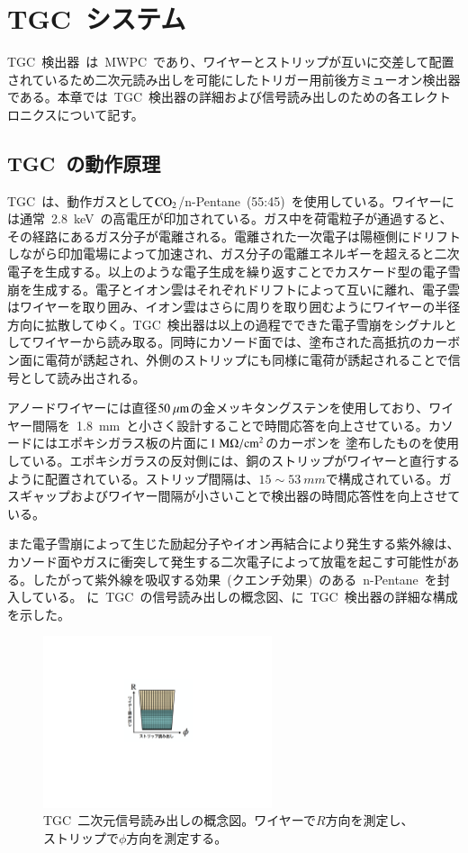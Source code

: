 \chapter{TGC~システム}
\thispagestyle{empty}
\label{chap:4}
TGC~検出器~\cite{TR:04}は~MWPC~であり、ワイヤーとストリップが互いに交差して配置されているため二次元読み出しを可能にしたトリガー用前後方ミューオン検出器である。本章では~TGC~検出器の詳細および信号読み出しのための各エレクトロニクスについて記す。
\section{TGC~の動作原理}
TGC~は、動作ガスとして$\rm{CO_2}$/n-Pentane~(55:45)~を使用している。ワイヤーには通常~2.8~keV~の高電圧が印加されている。ガス中を荷電粒子が通過すると、その経路にあるガス分子が電離される。電離された一次電子は陽極側にドリフトしながら印加電場によって加速され、ガス分子の電離エネルギーを超えると二次電子を生成する。以上のような電子生成を繰り返すことでカスケード型の電子雪崩を生成する。電子とイオン雲はそれぞれドリフトによって互いに離れ、電子雲はワイヤーを取り囲み、イオン雲はさらに周りを取り囲むようにワイヤーの半径方向に拡散してゆく。TGC~検出器は以上の過程でできた電子雪崩をシグナルとしてワイヤーから読み取る。同時にカソード面では、塗布された高抵抗のカーボン面に電荷が誘起され、外側のストリップにも同様に電荷が誘起されることで信号として読み出される。

アノードワイヤーには直径$50~\mu\rm{m}$の金メッキタングステンを使用しており、ワイヤー間隔を~1.8~mm~と小さく設計することで時間応答を向上させている。カソードにはエポキシガラス板の片面に$\rm{1}~\rm{M}\Omega/\rm{cm}^2$のカーボンを
塗布したものを使用している。エポキシガラスの反対側には、銅のストリップがワイヤーと直行するように配置されている。ストリップ間隔は、$15\sim53~mm$で構成されている。ガスギャップおよびワイヤー間隔が小さいことで検出器の時間応答性を向上させている。

また電子雪崩によって生じた励起分子やイオン再結合により発生する紫外線は、カソード面やガスに衝突して発生する二次電子によって放電を起こす可能性がある。したがって紫外線を吸収する効果~(クエンチ効果)~のある~n-Pentane~を封入している。
に~TGC~の信号読み出しの概念図、に~TGC~検出器の詳細な構成を示した。

\begin{figure}[tbp]
        \centering   
        \includegraphics[width=0.6\textwidth,page=1]{img/pdf/tgc2d.pdf}
        \caption[TGC~二次元信号読み出しの概念図]{TGC~二次元信号読み出しの概念図。ワイヤーで$R$方向を測定し、ストリップで$\phi$方向を測定する。}\label{fig:tgc2d}
\end{figure}

